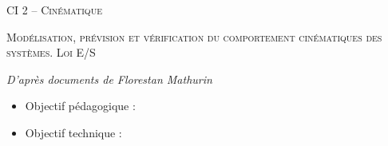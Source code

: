 \documentclass[11pt,oneside]{article}
\begin{document}
\pagestyle{fancy}
\renewcommand{\headrulewidth}{0pt}

\fancyhead{}

\fancyhead[C]{\rule{12cm}{.5pt}}


\renewcommand{\footrulewidth}{0.2pt}

\fancyfoot[C]{\footnotesize{\bfseries \thepage}}



\begin{center}
 \huge\textsc{CI 2 -- Cinématique}

 \large\textsc{Modélisation, prévision et vérification du comportement cinématiques des systèmes. Loi E/S}
\end{center}


\begin{flushright}
\textit{D'après documents de Florestan Mathurin}
\end{flushright}

\vspace{.5cm}




\begin{contexte}
\begin{itemize}
\item Objectif pédagogique : 
\item Objectif technique : 
\end{itemize}
\end{contexte}
\end{document}

